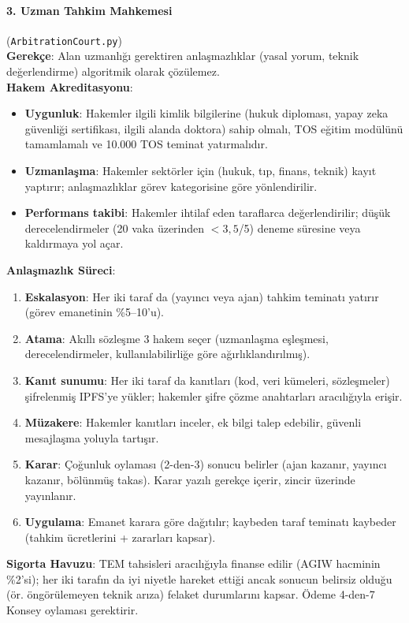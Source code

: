 \documentclass[11pt]{article}
\begin{document}
\paragraph{3. Uzman Tahkim Mahkemesi} (\texttt{ArbitrationCourt.py})\\
\textbf{Gerekçe}: Alan uzmanlığı gerektiren anlaşmazlıklar (yasal yorum, teknik değerlendirme) algoritmik olarak çözülemez.\\
\textbf{Hakem Akreditasyonu}:
\begin{itemize}[noitemsep]
  \item \textbf{Uygunluk}: Hakemler ilgili kimlik bilgilerine (hukuk diploması, yapay zeka güvenliği sertifikası, ilgili alanda doktora) sahip olmalı, TOS eğitim modülünü tamamlamalı ve 10.000 TOS teminat yatırmalıdır.
  \item \textbf{Uzmanlaşma}: Hakemler sektörler için (hukuk, tıp, finans, teknik) kayıt yaptırır; anlaşmazlıklar görev kategorisine göre yönlendirilir.
  \item \textbf{Performans takibi}: Hakemler ihtilaf eden taraflarca değerlendirilir; düşük derecelendirmeler (20 vaka üzerinden $<3,5$/5) deneme süresine veya kaldırmaya yol açar.
\end{itemize}
\textbf{Anlaşmazlık Süreci}:
\begin{enumerate}[noitemsep]
  \item \textbf{Eskalasyon}: Her iki taraf da (yayıncı veya ajan) tahkim teminatı yatırır (görev emanetinin \%5--10'u).
  \item \textbf{Atama}: Akıllı sözleşme 3 hakem seçer (uzmanlaşma eşleşmesi, derecelendirmeler, kullanılabilirliğe göre ağırlıklandırılmış).
  \item \textbf{Kanıt sunumu}: Her iki taraf da kanıtları (kod, veri kümeleri, sözleşmeler) şifrelenmiş IPFS'ye yükler; hakemler şifre çözme anahtarları aracılığıyla erişir.
  \item \textbf{Müzakere}: Hakemler kanıtları inceler, ek bilgi talep edebilir, güvenli mesajlaşma yoluyla tartışır.
  \item \textbf{Karar}: Çoğunluk oylaması (2-den-3) sonucu belirler (ajan kazanır, yayıncı kazanır, bölünmüş takas). Karar yazılı gerekçe içerir, zincir üzerinde yayınlanır.
  \item \textbf{Uygulama}: Emanet karara göre dağıtılır; kaybeden taraf teminatı kaybeder (tahkim ücretlerini + zararları kapsar).
\end{enumerate}
\textbf{Sigorta Havuzu}: TEM tahsisleri aracılığıyla finanse edilir (AGIW hacminin \%2'si); her iki tarafın da iyi niyetle hareket ettiği ancak sonucun belirsiz olduğu (ör. öngörülemeyen teknik arıza) felaket durumlarını kapsar. Ödeme 4-den-7 Konsey oylaması gerektirir.
\end{document}
